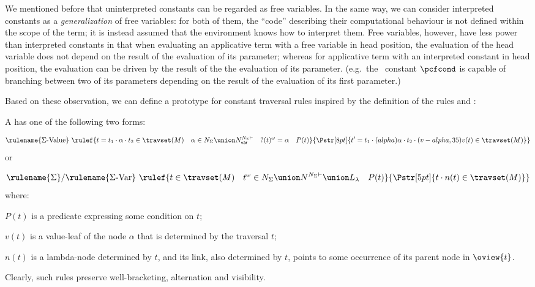 We mentioned before that uninterpreted constants can be regarded as
free variables. In the same way, we can consider interpreted
constants as a \emph{generalization} of free variables: for both of
them, the ``code'' describing their computational behaviour is not
defined within the scope of the term; it is instead assumed that the
environment knows how to interpret them. Free variables, however,
have less power than interpreted constants in that when evaluating
an applicative term with a free variable in head position, the
evaluation of the head variable does not depend on the result of the
evaluation of its parameter; whereas for applicative term with an
interpreted constant in head position, the evaluation can be driven
by the result of the the evaluation of its parameter. (e.g.\ the
\pcf\ constant $\pcfcond$ is capable of branching between two of its
parameters depending on the result of the evaluation of its first
parameter.)

Based on these observation, we can define a prototype for constant
traversal rules inspired by the definition of the rules
 and :
\begin{definition}
    \label{def:constant_traversal} A  has
    one of the following two forms:
        $$\rulename{\Sigma\mbox{-Value}}\ \rulef{t = t_1\cdot \alpha \cdot t_2 \in \travset(M) \quad \alpha \in N_\Sigma \union N^{N_\Sigma\vdash}_{\sf var} \quad ?(t)^\omega = \alpha \quad P(t)}
          {
            \stackrel{\rule{0pt}{3pt} }{
                \Pstr[8pt]{ t' = t_1\cdot (alpha){\alpha} \cdot t_2 \cdot (v-alpha,35){v(t)} \in {\travset(M)}}
                }
           }
           $$
    or
    $$\rulename{\Sigma}/\rulename{\Sigma\mbox{-Var}}\ \rulef{t \in \travset(M) \quad t^\omega\in N_\Sigma \union N^{N_\Sigma\vdash}\union L_\lambda \quad P(t)}
      { \stackrel{  \rule{0pt}{3pt} }{\Pstr[5pt]{ t \cdot {n(t)} \in {\travset(M)}}}
       }$$
        where:
        \begin{compactitem}
          \item $P(t)$ is a predicate expressing some condition on $t$;
          \item $v(t)$ is a value-leaf of the node $\alpha$ that is determined by the traversal $t$;
          \item $n(t)$ is a lambda-node determined by $t$, and its link, also determined by $t$, points to some occurrence of its parent node in $\oview{t}$.
        \end{compactitem}
    Clearly, such rules preserve well-bracketing, alternation and visibility.
\end{definition}

